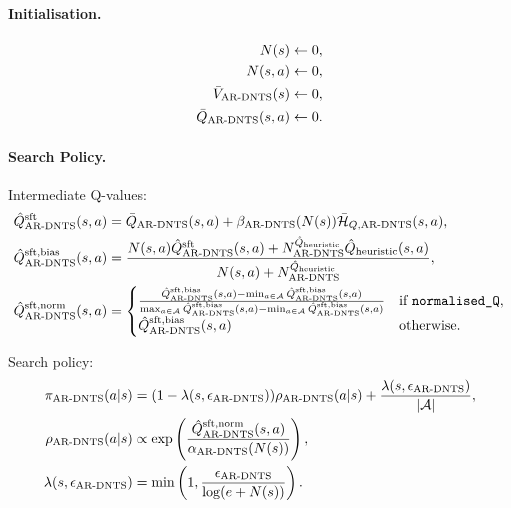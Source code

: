     \paragraph{Initialisation.}
        \begin{align}
            N(s) \leftarrow 0, \\
            N(s,a) \leftarrow 0, \\
            \Vardents(s) \leftarrow 0, \\
            \Qardents(s,a) \leftarrow 0.
        \end{align}

    \paragraph{Search Policy.}
        Intermediate Q-values:
        \begin{align}
            \Qardentssoft(s,a) &= \Qardents(s,a)+\betaardents(N(s))\HQardents(s,a), \\
            \Qardentsbias(s,a) &= \frac{N(s,a) \Qardentssoft(s,a) +  \Nqardents \Qinit(s,a)}{N(s,a)+\Nqardents}, \\
            \Qardentsnorm(s,a) &= 
            \begin{cases}
                \frac{\Qardentsbias(s,a)-\min_{a\in\cl{A}}\Qardentsbias(s,a)}{\max_{a\in\cl{A}}\Qardentsbias(s,a)-\min_{a\in\cl{A}}\Qardentsbias(s,a)} & \text{if } \normalisedq, \\
                \Qardentsbias(s,a) & \text{otherwise.}
            \end{cases}
        \end{align}

        Search policy:
        \begin{align}
            \piardents(a|s) &= (1-\lambdaardents)\rhoardents(a|s) + \frac{\lambdaardents}{|\cl{A}|}, \\ 
            \rhoardents(a|s) &\propto \exp\left(\frac{\Qardentsnorm(s,a)}{\alphaardents(N(s))}\right), \\
            \lambdaardents &= \min\left(1, \frac{\epsardents}{\log(e+N(s))}\right).
        \end{align}

